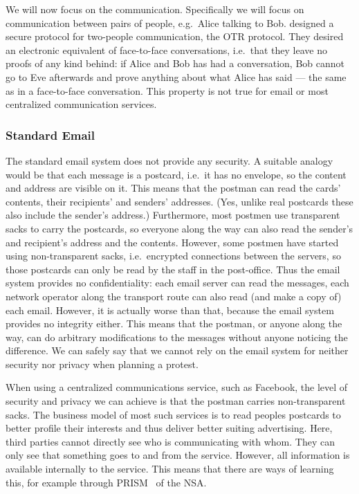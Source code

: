 We will now focus on the communication.
Specifically we will focus on communication between pairs of people, e.g.\ 
Alice talking to Bob.
\citeauthor{otr2004} designed a secure protocol for two-people communication, 
the \ac{OTR} protocol.
They desired an electronic equivalent of face-to-face conversations, i.e.\ that 
they leave no proofs of any kind behind:
if Alice and Bob has had a conversation, Bob cannot go to Eve afterwards and 
prove anything about what Alice has said --- the same as in a face-to-face 
conversation.
This property is not true for email or most centralized communication services.

\subsubsection{Standard Email}

The standard email system does not provide any security.
A suitable analogy would be that each message is a postcard, i.e.\ it has no 
envelope, so the content and address are visible on it.
This means that the postman can read the cards' contents, their recipients' and
senders' addresses.
(Yes, unlike real postcards these also include the sender's address.)
Furthermore, most postmen use transparent sacks to carry the postcards, so 
everyone along the way can also read the sender's and recipient's address and 
the contents.
However, some postmen have started using non-transparent sacks, i.e.\ encrypted 
connections between the servers, so those postcards can only be read by the 
staff in the post-office.
Thus the email system provides no confidentiality: each email server can read 
the messages, each network operator along the transport route can also read 
(and make a copy of) each email.
However, it is actually worse than that, because the email system provides no 
integrity either.
This means that the postman, or anyone along the way, can do arbitrary 
modifications to the messages without anyone noticing the difference.
We can safely say that we cannot rely on the email system for neither security 
nor privacy when planning a protest.

When using a centralized communications service, such as Facebook, the level of
security and privacy we can achieve is that the postman carries non-transparent
sacks.
The business model of most such services is to read peoples postcards to better
profile their interests and thus deliver better suiting advertising.
Here, third parties cannot directly see who is communicating with whom.
They can only see that something goes to and from the service.
However, all information is available internally to the service.
This means that there are ways of learning this, for example through 
PRISM~\cite{Prism} of the \ac{NSA}.

